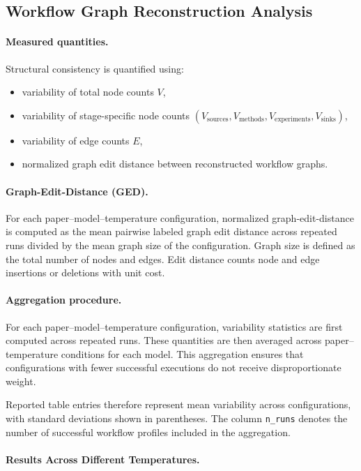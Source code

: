 \documentclass{article}
\begin{document}
\newpage
\subsection{Workflow Graph Reconstruction Analysis}

\paragraph{Measured quantities.}
Structural consistency is quantified using:
\begin{itemize}
    \item variability of total node counts $V$,
    \item variability of stage-specific node counts
    $(V_{\text{sources}}, V_{\text{methods}}, V_{\text{experiments}}, V_{\text{sinks}})$,
    \item variability of edge counts $E$,
    \item normalized graph edit distance between reconstructed workflow graphs.
\end{itemize}

\paragraph{Graph-Edit-Distance (GED).}
For each paper--model--temperature configuration, normalized graph-edit-distance is computed as the mean pairwise labeled graph edit distance across repeated runs divided by the mean graph size of the configuration.
Graph size is defined as the total number of nodes and edges.
Edit distance counts node and edge insertions or deletions with unit cost.

\paragraph{Aggregation procedure.}
For each paper--model--temperature configuration, variability statistics are first computed across repeated runs.
These quantities are then averaged across paper--temperature conditions for each model.
This aggregation ensures that configurations with fewer successful executions do not receive disproportionate weight.

Reported table entries therefore represent mean variability across configurations, with standard deviations shown in parentheses.
The column \texttt{n\_runs} denotes the number of successful workflow profiles included in the aggregation.

\paragraph{Results Across Different Temperatures.}
\end{document}
